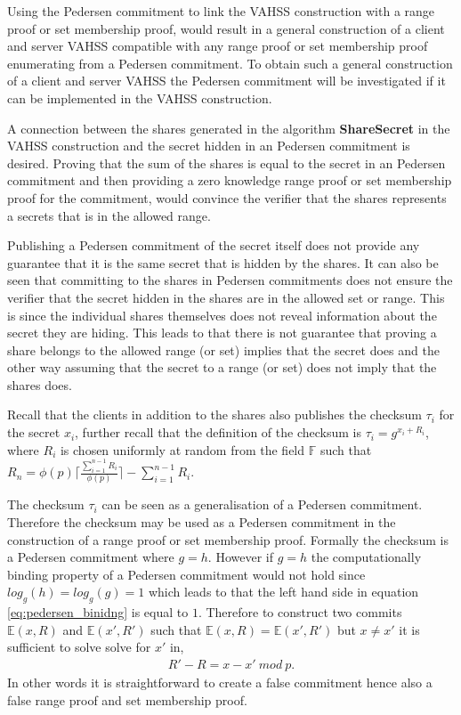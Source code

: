 Using the Pedersen commitment to link the VAHSS construction with a range proof or set membership proof, would result in a general construction of a client and server VAHSS compatible with any range proof or set membership proof enumerating from a Pedersen commitment. To obtain such a general construction of a client and server VAHSS the Pedersen commitment will be investigated if it can be implemented in the VAHSS construction. 

A connection between the shares generated in the algorithm \textbf{ShareSecret} in the VAHSS construction and the secret hidden in an Pedersen commitment is desired. Proving that the sum of the shares is equal to the secret in an Pedersen commitment and then providing a zero knowledge range proof or set membership proof for the commitment, would convince the verifier that the shares represents a secrets that is in the allowed range.  

Publishing a Pedersen commitment of the secret itself does not provide any guarantee that it is the same secret that is hidden by the shares. It can also be seen that committing to the shares in Pedersen commitments does not ensure the verifier that the secret hidden in the shares are in the allowed set or range. This is since the individual shares themselves does not reveal information about the secret they are hiding. This leads to that there is not guarantee that proving a share belongs to the allowed range (or set) implies that the secret does and the other way assuming that the secret to a range (or set) does not imply that the shares does.


Recall that the clients in addition to the shares also publishes the checksum $\tau_i$ for the secret $x_i$, further recall that the definition of the checksum is  $\tau_i=g^{x_i+R_i}$, where $R_i$ is chosen uniformly at random from the field $\mathds{F}$ such that $R_n =\phi(p) \lceil \frac{\sum_{i=1}^{n-1}R_i}{\phi(p)}\rceil - \sum_{i=1}^{n-1}R_i$. 

The checksum $\tau_i$ can be seen as a generalisation of a Pedersen commitment. Therefore the  checksum may be used as a Pedersen commitment in the construction of a range proof  or set membership proof. Formally the checksum is a Pedersen commitment where $g=h$. However if $g=h$ the computationally binding property of a Pedersen commitment would not hold since $log_g(h)=log_g(g)=1$ which leads to that the left hand side in equation \eqref{eq:pedersen_binidng} is equal to $1$. Therefore to construct two commits $\mathds{E}(x,R)$ and $\mathds{E}(x',R')$ such that $\mathds{E}(x,R) = \mathds{E}(x',R')$ but $x\neq x'$ it is sufficient to solve solve for $x'$ in, 
\begin{align*}
R'-R = x-x'\:mod \:p .
\end{align*}
In other words it is straightforward to create a false commitment hence also a false range proof and set membership proof.


